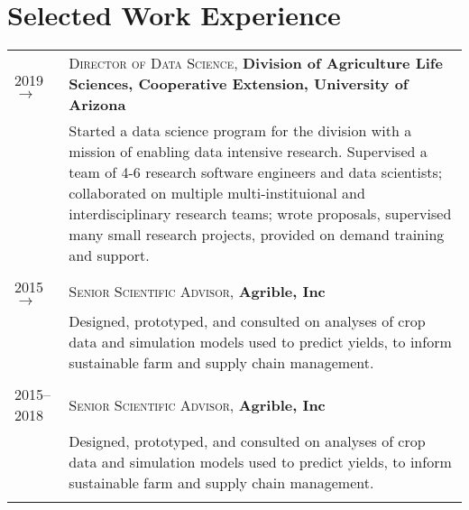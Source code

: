 \documentclass[a4paper,10pt]{article}
\begin{document}
\section{Selected Work Experience}


\begin{tabular}{lp{11cm}}

2019$\rightarrow$ & \textsc{Director of Data Science}, \textbf{Division of Agriculture Life Sciences, Cooperative Extension, University of Arizona}\\
& \footnotesize{Started a data science program for the division with a mission of enabling data intensive research. Supervised a team of 4-6 research software engineers and data scientists; collaborated on multiple multi-instituional and interdisciplinary research teams; wrote proposals, supervised many small research projects, provided on demand training and support.}\\
\multicolumn{2}{c}{} \\

2015$\rightarrow$ & \textsc{Senior Scientific Advisor}, \textbf{Agrible, Inc}\\
& \footnotesize{Designed, prototyped, and consulted on analyses of crop data and simulation models used to predict yields, to inform sustainable farm and supply chain management. }\\
\multicolumn{2}{c}{} \\


2015--2018 & \textsc{Senior Scientific Advisor}, \textbf{Agrible, Inc}\\
& \footnotesize{Designed, prototyped, and consulted on analyses of crop data and simulation models used to predict yields, to inform sustainable farm and supply chain management. }\\
\multicolumn{2}{c}{} \\


\end{tabular}
\end{document}
